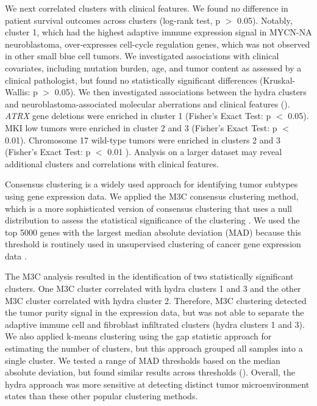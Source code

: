 \documentclass[10pt,letterpaper]{article}
\begin{document}
We next correlated clusters with clinical features. We found no difference in patient survival outcomes across clusters (log-rank test, p $>$ 0.05). Notably, cluster 1, which had the highest adaptive immune expression signal in MYCN-NA neuroblastoma, over-expresses cell-cycle regulation genes, which was not observed in other small blue cell tumors. We investigated associations with clinical covariates, including mutation burden, age, and tumor content as assessed by a clinical pathologist, but found no statistically significant differences (Kruskal-Wallis: p $>$ 0.05). We then investigated associations between the hydra clusters and neuroblastoma-associated molecular aberrations and clinical features (). \textit{ATRX} gene deletions were enriched in cluster 1 (Fisher’s Exact Test: p $<$ 0.05). MKI low tumors were enriched in cluster 2 and 3 (Fisher’s Exact Test: p $<$ 0.01). Chromosome 17 wild-type tumors were enriched in clusters 2 and 3 (Fisher’s Exact Test: p $<$ 0.01 ). Analysis on a larger dataset may reveal additional clusters and correlations with clinical features.

Consensus clustering is a widely used approach for identifying tumor subtypes using gene expression data. We applied the M3C consensus clustering method, which is a more sophisticated version of consensus clustering that uses a null distribution to assess the statistical significance of the clustering \cite{johnM3CMonteCarlo2018, wilkersonConsensusClusterPlusClassDiscovery2010a}. We used the top 5000 genes with the largest median absolute deviation (MAD) because this threshold is routinely used in unsupervised clustering of cancer gene expression data \cite{bourgonIndependentFilteringIncreases2010, tritchlerFilteringGenesCluster2009, carcamo-oriveAnalysisTranscriptionalVariability2017}.

The M3C analysis resulted in the identification of two statistically significant clusters. One M3C cluster correlated with hydra clusters 1 and 3 and the other M3C cluster correlated with hydra cluster 2. Therefore, M3C clustering detected the tumor purity signal in the expression data, but was not able to separate the adaptive immune cell and fibroblast infiltrated clusters (hydra clusters 1 and 3). We also applied k-means clustering using the gap statistic approach \cite{tibshirani2001estimating,maechler2012cluster} for estimating the number of clusters, but this approach grouped all samples into a single cluster. We tested a range of MAD thresholds based on the median absolute deviation, but found similar results across thresholds (). Overall, the hydra approach was more sensitive at detecting distinct tumor microenvironment states than these other popular clustering methods.
\end{document}
